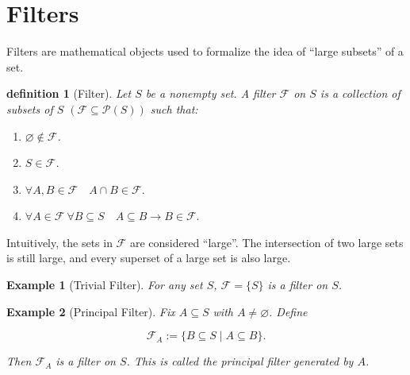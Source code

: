 \documentclass[10pt,a4paper]{book}
\let\emptyset\varnothing
\newtheorem{definition}{definition}[section]
\newtheorem{example}{Example}[section]
\begin{document}
\section{Filters}

Filters are mathematical objects used to formalize the idea of ``large
subsets'' of a set.

\begin{definition}[Filter]

    Let $S$ be a nonempty set. A \emph{filter} $\mathcal{F}$ on $S$ is a collection
    of subsets of $S$ $( \mathcal{F} \subseteq \mathcal{P} (S) )$ such that:

    \begin{enumerate}

        \item $\emptyset\notin\mathcal{F}$.

        \item $S\in\mathcal{F}$.

        \item  $\forall A , B  \in \mathcal{F} \quad A\cap B\in\mathcal{F}.$

        \item  $\forall A \in \mathcal{F} \ \forall  B  \subseteq S \quad  A \subseteq B \to B\in\mathcal{F}.$

    \end{enumerate}

\end{definition}

Intuitively, the sets in $\mathcal{F}$ are considered ``large''. The
intersection of two large sets is still large, and every superset of a large
set is also large.

\begin{example}[Trivial Filter]

    For any set $S$,
    $
        \mathcal{F}=\{S\}
    $
    is a filter on $S$.

\end{example}

\begin{example}[Principal Filter]

    Fix $A\subseteq S$ with $A\neq\emptyset$. Define

    $$
        \mathcal{F}_A:=\{B\subseteq S \mid A\subseteq B\}.
    $$

    Then $\mathcal{F}_A$ is a filter on $S$. This is called the \emph{principal
        filter generated by $A$}.

\end{example}
\end{document}
